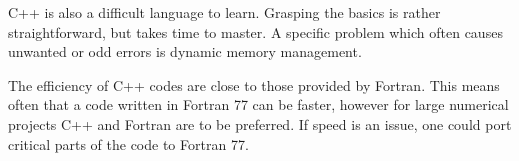 C++ is also a difficult language to learn. Grasping the basics is rather straightforward, but takes time
to master. A specific problem which often causes 
unwanted or odd errors is dynamic memory management.

The efficiency of C++ codes are close to those provided by Fortran. This means often that a code
written in Fortran 77 can be faster, however  for large numerical projects C++ and Fortran 
are to be preferred. If speed is an issue, one could port critical parts of the code to Fortran 77.


